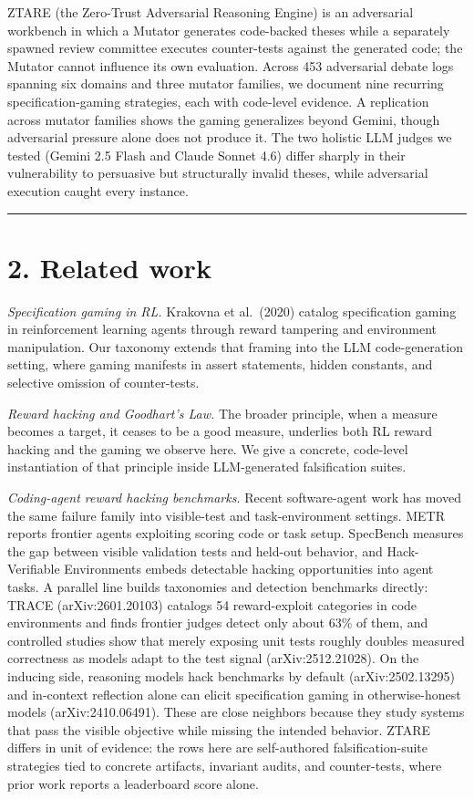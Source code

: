 \documentclass[
  11pt]{article}
\begin{document}
ZTARE (the Zero-Trust Adversarial Reasoning Engine) is an adversarial
workbench in which a Mutator generates code-backed theses while a
separately spawned review committee executes counter-tests against the
generated code; the Mutator cannot influence its own evaluation. Across
453 adversarial debate logs spanning six domains and three mutator
families, we document nine recurring specification-gaming strategies,
each with code-level evidence. A replication across mutator families
shows the gaming generalizes beyond Gemini, though adversarial pressure
alone does not produce it. The two holistic LLM judges we tested (Gemini
2.5 Flash and Claude Sonnet 4.6) differ sharply in their vulnerability
to persuasive but structurally invalid theses, while adversarial
execution caught every instance.

\begin{center}\rule{0.5\linewidth}{0.5pt}\end{center}

\section{2. Related work}\label{related-work}

\emph{Specification gaming in RL.} Krakovna et al.~(2020) catalog
specification gaming in reinforcement learning agents through reward
tampering and environment manipulation. Our taxonomy extends that
framing into the LLM code-generation setting, where gaming manifests in
assert statements, hidden constants, and selective omission of
counter-tests.

\emph{Reward hacking and Goodhart's Law.} The broader principle, when a
measure becomes a target, it ceases to be a good measure, underlies both
RL reward hacking and the gaming we observe here. We give a concrete,
code-level instantiation of that principle inside LLM-generated
falsification suites.

\emph{Coding-agent reward hacking benchmarks.} Recent software-agent
work has moved the same failure family into visible-test and
task-environment settings. METR reports frontier agents exploiting
scoring code or task setup. SpecBench measures the gap between visible
validation tests and held-out behavior, and Hack-Verifiable Environments
embeds detectable hacking opportunities into agent tasks. A parallel
line builds taxonomies and detection benchmarks directly: TRACE
(arXiv:2601.20103) catalogs 54 reward-exploit categories in code
environments and finds frontier judges detect only about 63\% of them,
and controlled studies show that merely exposing unit tests roughly
doubles measured correctness as models adapt to the test signal
(arXiv:2512.21028). On the inducing side, reasoning models hack
benchmarks by default (arXiv:2502.13295) and in-context reflection alone
can elicit specification gaming in otherwise-honest models
(arXiv:2410.06491). These are close neighbors because they study systems
that pass the visible objective while missing the intended behavior.
ZTARE differs in unit of evidence: the rows here are self-authored
falsification-suite strategies tied to concrete artifacts, invariant
audits, and counter-tests, where prior work reports a leaderboard score
alone.
\end{document}
